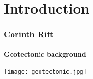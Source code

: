 \graphicspath{{Chapter1/Figs/}}

\section{Introduction}

\begin{frame}
  \frametitle{Corinth Rift}
  \framesubtitle{Geotectonic background}
  \label{}
  \begin{center}
    \texttt{[image: geotectonic.jpg]}
  \end{center}
  \begin{footnotesize}
    \citep{FernandezBlanco2019}
  \end{footnotesize}
  
\end{frame}
\note{}

\note{}

